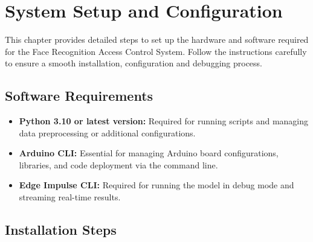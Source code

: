 %
%

\chapter{System Setup and Configuration}

This chapter provides detailed steps to set up the hardware and software required for the Face Recognition Access Control System. Follow the instructions carefully to ensure a smooth installation, configuration and debugging process.

\section{Software Requirements}
\begin{itemize}
	\item \textbf{Python 3.10 or latest version:} Required for running scripts and managing data preprocessing or additional configurations.
	\item \textbf{Arduino CLI:} Essential for managing Arduino board configurations, libraries, and code deployment via the command line.
	\item \textbf{Edge Impulse CLI:} Required for running the model in debug mode and streaming real-time results.
\end{itemize}

\section{Installation Steps}

